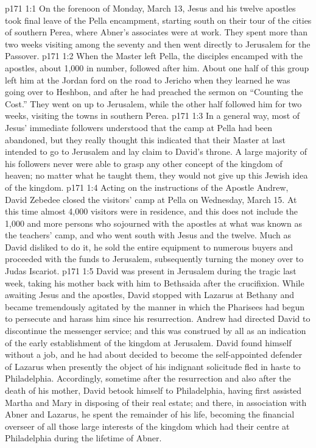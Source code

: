 \vs p171 1:1 On the forenoon of Monday, March 13, Jesus and his twelve apostles took final leave of the Pella encampment, starting south on their tour of the cities of southern Perea, where Abner’s associates were at work. They spent more than two weeks visiting among the seventy and then went directly to Jerusalem for the Passover.
\vs p171 1:2 When the Master left Pella, the disciples encamped with the apostles, about 1,000 in number, followed after him. About one half of this group left him at the Jordan ford on the road to Jericho when they learned he was going over to Heshbon, and after he had preached the sermon on “Counting the Cost.” They went on up to Jerusalem, while the other half followed him for two weeks, visiting the towns in southern Perea.
\vs p171 1:3 In a general way, most of Jesus’ immediate followers understood that the camp at Pella had been abandoned, but they really thought this indicated that their Master at last intended to go to Jerusalem and lay claim to David’s throne. A large majority of his followers never were able to grasp any other concept of the kingdom of heaven; no matter what he taught them, they would not give up this Jewish idea of the kingdom.
\vs p171 1:4 Acting on the instructions of the Apostle Andrew, David Zebedee closed the visitors’ camp at Pella on Wednesday, March 15. At this time almost 4,000 visitors were in residence, and this does not include the 1,000 and more persons who sojourned with the apostles at what was known as the teachers’ camp, and who went south with Jesus and the twelve. Much as David disliked to do it, he sold the entire equipment to numerous buyers and proceeded with the funds to Jerusalem, subsequently turning the money over to Judas Iscariot.
\vs p171 1:5 \pc David was present in Jerusalem during the tragic last week, taking his mother back with him to Bethsaida after the crucifixion. While awaiting Jesus and the apostles, David stopped with Lazarus at Bethany and became tremendously agitated by the manner in which the Pharisees had begun to persecute and harass him since his resurrection. Andrew had directed David to discontinue the messenger service; and this was construed by all as an indication of the early establishment of the kingdom at Jerusalem. David found himself without a job, and he had about decided to become the self\hyp{}appointed defender of Lazarus when presently the object of his indignant solicitude fled in haste to Philadelphia. Accordingly, sometime after the resurrection and also after the death of his mother, David betook himself to Philadelphia, having first assisted Martha and Mary in disposing of their real estate; and there, in association with Abner and Lazarus, he spent the remainder of his life, becoming the financial overseer of all those large interests of the kingdom which had their centre at Philadelphia during the lifetime of Abner.
